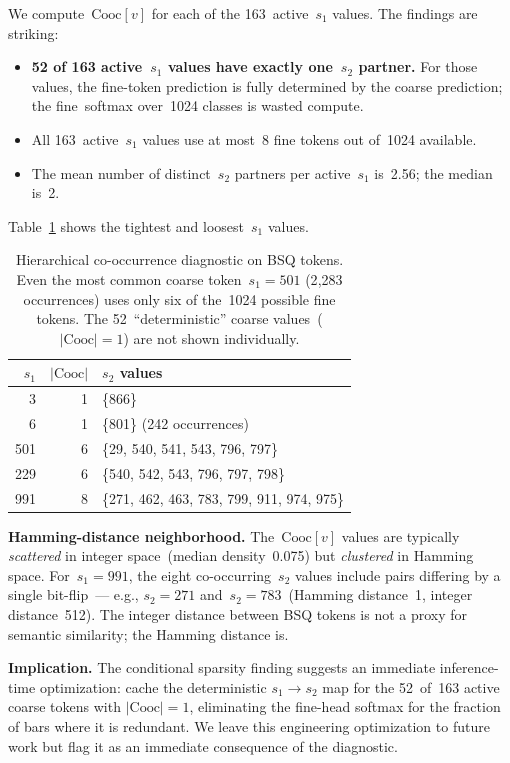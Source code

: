 \documentclass[10pt]{article}
\begin{document}
We compute~$\mathrm{Cooc}[v]$ for each of the 163~active~$s_1$
values. The findings are striking:
\begin{itemize}
\item \textbf{52 of 163 active~$s_1$ values have exactly
one~$s_2$ partner.} For those values, the fine-token prediction is
fully determined by the coarse prediction; the
fine~softmax over~1024 classes is wasted compute.
\item All 163~active~$s_1$ values use at most~8 fine tokens out
of~1024 available.
\item The mean number of distinct~$s_2$ partners per active~$s_1$
is~2.56; the median is~2.
\end{itemize}

Table~\ref{tab:cooc} shows the tightest and loosest~$s_1$ values.

\begin{table}[t]
\centering
\caption{Hierarchical co-occurrence diagnostic on BSQ tokens. Even
the most common coarse token~$s_1=501$ (2{,}283 occurrences) uses
only six of the~1024 possible fine tokens. The 52~``deterministic''
coarse values~($|\mathrm{Cooc}|=1$) are not shown
individually.}\label{tab:cooc}
\begin{tabular}{rrl}
\toprule
$s_1$ & $|\mathrm{Cooc}|$ & $s_2$ values \\
\midrule
3   & 1 & \{866\} \\
6   & 1 & \{801\} (242 occurrences) \\
\midrule
501 & 6 & \{29, 540, 541, 543, 796, 797\} \\
229 & 6 & \{540, 542, 543, 796, 797, 798\} \\
991 & 8 & \{271, 462, 463, 783, 799, 911, 974, 975\} \\
\bottomrule
\end{tabular}
\end{table}

\textbf{Hamming-distance neighborhood.} The~$\mathrm{Cooc}[v]$ values
are typically \emph{scattered} in integer space~(median
density~0.075) but \emph{clustered} in Hamming
space. For~$s_1=991$, the eight co-occurring~$s_2$ values include
pairs differing by a single bit-flip~--- e.g., $s_2=271$
and~$s_2=783$~(Hamming distance~1, integer distance~512). The integer
distance between BSQ tokens is not a proxy for semantic similarity;
the Hamming distance is.

\textbf{Implication.} The conditional sparsity finding suggests an
immediate inference-time optimization: cache the deterministic
$s_1 \to s_2$ map for the 52~of~163 active coarse tokens with
$|\mathrm{Cooc}|=1$, eliminating the fine-head softmax for the
fraction of bars where it is redundant. We leave this engineering
optimization to future work but flag it as an immediate consequence
of the diagnostic.
\end{document}
